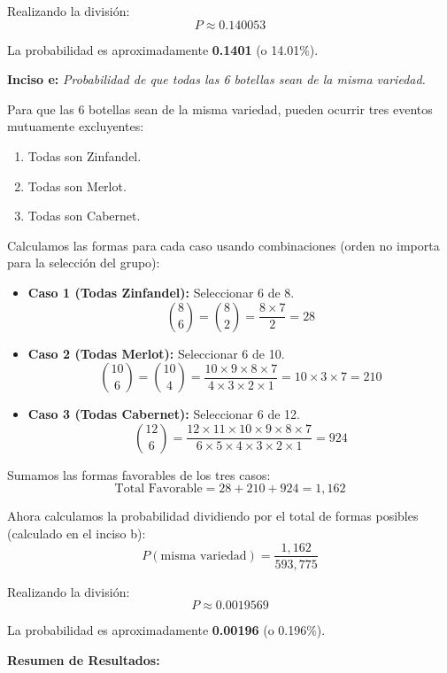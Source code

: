 \documentclass[a4paper]{article}
\begin{document}
Realizando la división:
$$ P \approx 0.140053 $$

La probabilidad es aproximadamente \textbf{0.1401} (o 14.01\%).

\vspace{0.3cm}

\textbf{Inciso e:} \textit{Probabilidad de que todas las 6 botellas sean de la misma variedad.}

Para que las 6 botellas sean de la misma variedad, pueden ocurrir tres eventos mutuamente excluyentes:
\begin{enumerate}
    \item Todas son Zinfandel.
    \item Todas son Merlot.
    \item Todas son Cabernet.
\end{enumerate}

Calculamos las formas para cada caso usando combinaciones (orden no importa para la selección del grupo):

\begin{itemize}
    \item \textbf{Caso 1 (Todas Zinfandel):} Seleccionar 6 de 8.
    $$ \binom{8}{6} = \binom{8}{2} = \frac{8 \times 7}{2} = 28 $$
    
    \item \textbf{Caso 2 (Todas Merlot):} Seleccionar 6 de 10.
    $$ \binom{10}{6} = \binom{10}{4} = \frac{10 \times 9 \times 8 \times 7}{4 \times 3 \times 2 \times 1} = 10 \times 3 \times 7 = 210 $$
    
    \item \textbf{Caso 3 (Todas Cabernet):} Seleccionar 6 de 12.
    $$ \binom{12}{6} = \frac{12 \times 11 \times 10 \times 9 \times 8 \times 7}{6 \times 5 \times 4 \times 3 \times 2 \times 1} = 924 $$
\end{itemize}

Sumamos las formas favorables de los tres casos:
$$ \text{Total Favorable} = 28 + 210 + 924 = 1,162 $$

Ahora calculamos la probabilidad dividiendo por el total de formas posibles (calculado en el inciso b):
$$ P(\text{misma variedad}) = \frac{1,162}{593,775} $$

Realizando la división:
$$ P \approx 0.0019569 $$

La probabilidad es aproximadamente \textbf{0.00196} (o 0.196\%).

\vspace{0.5cm}

\textbf{Resumen de Resultados:}
\end{document}
